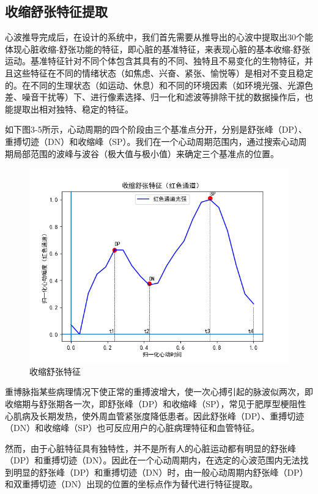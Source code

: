 \subsection{收缩舒张特征提取}
{心波推导完成后，在设计的系统中，我们首先需要从推导出的心波中提取出30个能体现心脏收缩-舒张功能的特征，即心脏的基准特征，来表现心脏的基本收缩-舒张运动。基准特征针对不同个体包含其具有的不同、独特且不易变化的生物特征，并且这些特征在不同的情绪状态（如焦虑、兴奋、紧张、愉悦等）是相对不变且稳定的\cite{2005ECG}。在不同的生理状态（如运动、休息）和不同的环境因素（如环境光强、光源色差、噪音干扰等）下、进行像素选择、归一化和滤波等排除干扰的数据操作后，也能提取出相对独特、稳定的特征。}
\par
{如下图3-5所示，心动周期的四个阶段由三个基准点分开，分别是舒张峰（DP）、重搏切迹（DN）和收缩峰（SP）\cite{2007Photoplethysmography}。我们在一个心动周期范围内，通过搜索心动周期局部范围的波峰与波谷（极大值与极小值）来确定三个基准点的位置。}
\par
\begin{figure}[htbp]
  \centering
  \includegraphics[width=0.8\linewidth]{images/Figure_13.png}
  \caption{收缩舒张特征}\label{6-1} %
\end{figure}
\par
{重博脉指某些病理情况下使正常的重搏波增大，使一次心搏引起的脉波似两次，即收缩期与舒张期各一次，即舒张峰（DP）和收缩峰（SP），常见于肥厚型梗阻性心肌病及长期发热，使外周血管紧张度降低患者。因此舒张峰（DP）、重搏切迹（DN）和收缩峰（SP）也可反应用户的心脏病理特征和血管特征\cite{Evelien2009The}。}
\par
{然而，由于心脏特征具有独特性，并不是所有人的心脏运动都有明显的舒张峰（DP）和重搏切迹（DN）。因此在一个心动周期内，在选定的心波范围内无法找到明显的舒张峰（DP）和重搏切迹（DN）时，由一般心动周期内舒张峰（DP）和双重搏切迹（DN）出现的位置的坐标点作为替代进行特征提取。}
